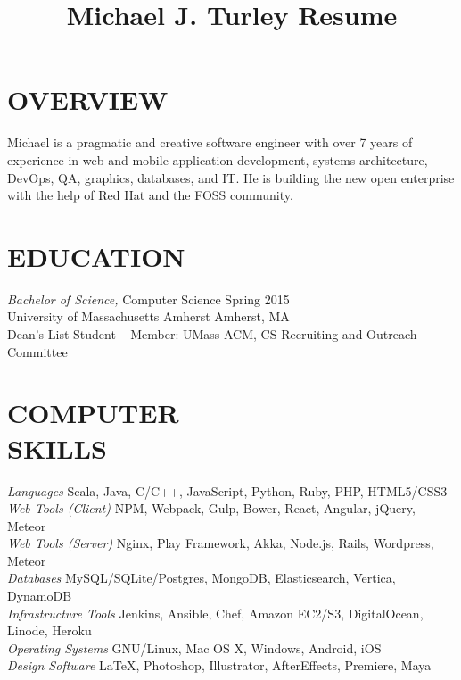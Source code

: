 \documentclass[line,margin]{res}
\begin{document}
\title{Michael J. Turley Resume}

\address{mike.turley@alum.cs.umass.edu | 781-264-6283 | 208 Prospect St, Athol, MA 01331}
\address{\href{https://github.com/mturley}{github.com/mturley}
    | \href{https://twitter.com/mundanedetail}{twitter.com/mundanedetail}
    | \href{https://www.linkedin.com/in/mturley/}{linkedin.com/in/mturley}}

\begin{resume}

\section{OVERVIEW}
    Michael is a pragmatic and creative software engineer with over 7 years of experience in web and mobile application development, systems architecture, DevOps, QA, graphics, databases, and IT. He is building the new open enterprise with the help of Red Hat and the FOSS community.

\section{EDUCATION}
    {\sl Bachelor of Science,} Computer Science \hfill Spring 2015 \\
    University of Massachusetts Amherst \hfill Amherst, MA \\
    Dean's List Student -- Member: UMass ACM, CS Recruiting and Outreach Committee


\section{COMPUTER \\ SKILLS}
    {\sl Languages} \hfill Scala, Java, C/C++, JavaScript, Python, Ruby, PHP, HTML5/CSS3 \\
    {\sl Web Tools (Client)} \hfill NPM, Webpack, Gulp, Bower, React, Angular, jQuery, Meteor \\
    {\sl Web Tools (Server)} \hfill Nginx, Play Framework, Akka, Node.js, Rails, Wordpress, Meteor \\
    {\sl Databases} \hfill MySQL/SQLite/Postgres, MongoDB, Elasticsearch, Vertica, DynamoDB \\
    {\sl Infrastructure Tools} \hfill Jenkins, Ansible, Chef, Amazon EC2/S3, DigitalOcean, Linode, Heroku \\
    {\sl Operating Systems} \hfill GNU/Linux, Mac OS X, Windows, Android, iOS \\
    {\sl Design Software} \hfill \LaTeX, Photoshop, Illustrator, AfterEffects, Premiere, Maya


\end{resume}
\end{document}
